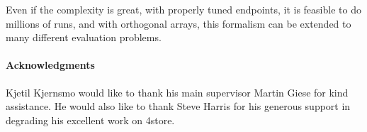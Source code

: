 \documentclass{llncs}
\begin{document}
Even if the complexity is great, with properly tuned endpoints, it is
feasible to do millions of runs, and with orthogonal arrays, this
formalism can be extended to many different evaluation problems.



\paragraph*{Acknowledgments}

Kjetil Kjernsmo would like to thank his main supervisor Martin Giese
for kind assistance. He would also like to thank Steve Harris for his
generous support in degrading his excellent work on 4store.


%
%
%


\end{document}
